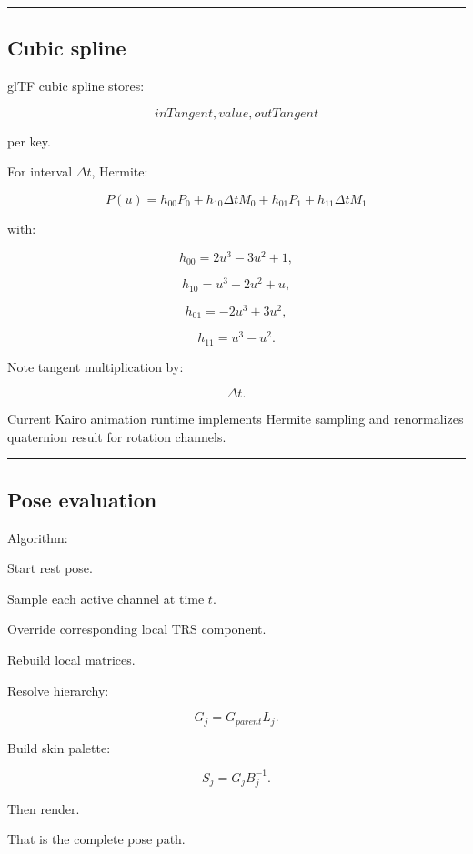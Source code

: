 \begin{center}\rule{0.5\linewidth}{0.5pt}\end{center}

\subsection{Cubic spline}\label{04-visual-computing-ii-ch041-cubic-spline}

glTF cubic spline stores:

\[
inTangent,
value,
outTangent
\]

per key.

For interval \(\Delta t\), Hermite:

\[
P(u)
=
h_{00}P_0
+
h_{10}\Delta t M_0
+
h_{01}P_1
+
h_{11}\Delta t M_1
\]

with:

\[
h_{00}=2u^3-3u^2+1,
\]

\[
h_{10}=u^3-2u^2+u,
\]

\[
h_{01}=-2u^3+3u^2,
\]

\[
h_{11}=u^3-u^2.
\]

Note tangent multiplication by:

\[
\Delta t.
\]

Current Kairo animation runtime implements Hermite sampling and renormalizes quaternion result for rotation channels.

\begin{center}\rule{0.5\linewidth}{0.5pt}\end{center}

\subsection{Pose evaluation}\label{04-visual-computing-ii-ch041-pose-evaluation}

Algorithm:

Start rest pose.

Sample each active channel at time \(t\).

Override corresponding local TRS component.

Rebuild local matrices.

Resolve hierarchy:

\[
G_j=
G_{parent}L_j.
\]

Build skin palette:

\[
S_j=
G_jB_j^{-1}.
\]

Then render.

That is the complete pose path.

